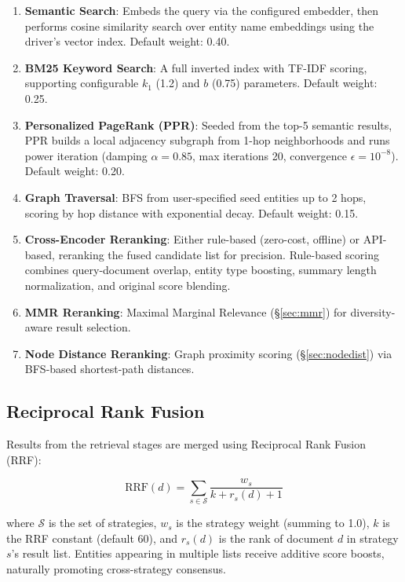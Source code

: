 \documentclass[11pt,a4paper,twocolumn]{article}
\begin{document}
\begin{enumerate}[leftmargin=*]
  \item \textbf{Semantic Search}: Embeds the query via the configured
    embedder, then performs cosine similarity search over entity name
    embeddings using the driver's vector index. Default weight: 0.40.
  \item \textbf{BM25 Keyword Search}: A full inverted index with
    TF-IDF scoring, supporting configurable $k_1$ (1.2) and $b$ (0.75)
    parameters. Default weight: 0.25.
  \item \textbf{Personalized PageRank (PPR)}: Seeded from the top-5
    semantic results, PPR builds a local adjacency subgraph from
    1-hop neighborhoods and runs power iteration (damping $\alpha=0.85$,
    max iterations 20, convergence $\epsilon=10^{-8}$). Default
    weight: 0.20.
  \item \textbf{Graph Traversal}: BFS from user-specified seed
    entities up to 2 hops, scoring by hop distance with exponential
    decay. Default weight: 0.15.
  \item \textbf{Cross-Encoder Reranking}: Either rule-based (zero-cost,
    offline) or API-based, reranking the fused candidate list for
    precision. Rule-based scoring combines query-document overlap,
    entity type boosting, summary length normalization, and original
    score blending.
  \item \textbf{MMR Reranking}: Maximal Marginal Relevance
    (\S\ref{sec:mmr}) for diversity-aware result selection.
  \item \textbf{Node Distance Reranking}: Graph proximity scoring
    (\S\ref{sec:nodedist}) via BFS-based shortest-path distances.
\end{enumerate}

\subsection{Reciprocal Rank Fusion}

Results from the retrieval stages are merged using Reciprocal Rank
Fusion (RRF):

\begin{equation}
\text{RRF}(d) = \sum_{s \in \mathcal{S}} \frac{w_s}{k + r_s(d) + 1}
\label{eq:rrf}
\end{equation}

where $\mathcal{S}$ is the set of strategies, $w_s$ is the strategy
weight (summing to 1.0), $k$ is the RRF constant (default 60), and
$r_s(d)$ is the rank of document $d$ in strategy $s$'s result list.
Entities appearing in multiple lists receive additive score boosts,
naturally promoting cross-strategy consensus.
\end{document}
